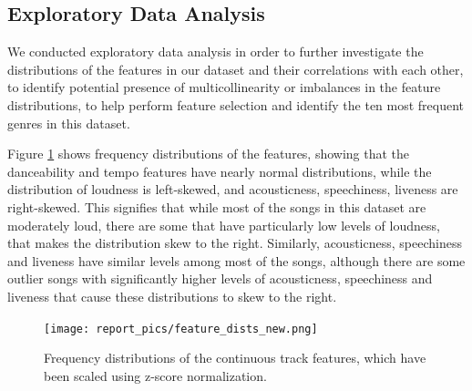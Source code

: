 \documentclass[times, twocolumn]{article}
\begin{document}
\subsection{Exploratory Data Analysis}
We conducted exploratory data analysis in order to further investigate the distributions of the features in our dataset and their correlations with each other, to identify potential presence of multicollinearity or imbalances in the feature distributions, to help perform feature selection and identify the ten most frequent genres in this dataset.

Figure \ref{graph:dists} shows frequency distributions of the features, showing that the danceability and tempo features have nearly normal distributions, while the distribution of loudness is left-skewed, and acousticness, speechiness, liveness are right-skewed. This signifies that while most of the songs in this dataset are moderately loud, there are some that have particularly low levels of loudness, that makes the distribution skew to the right. Similarly, acousticness, speechiness and liveness have similar levels among most of the songs, although there are some outlier songs with significantly higher levels of acousticness, speechiness and liveness that cause these distributions to skew to the right.

\begin{figure}[H]
    \centering
    \texttt{[image: report\_pics/feature\_dists\_new.png]}
    \caption{Frequency distributions of the continuous track features, which have been scaled using z-score normalization.}
    \label{graph:dists}
\end{figure}
\end{document}
